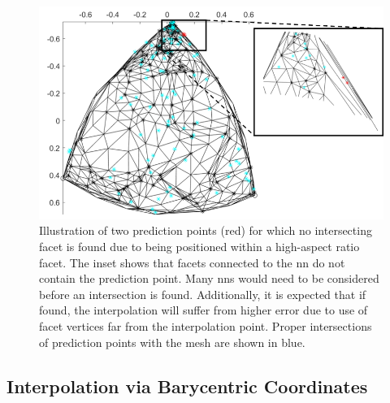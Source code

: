 \documentclass[final,twocolumn,12pt]{elsarticle}
\newcommand{\outpt}{prediction}
\begin{document}
\begin{appendices}
\begin{figure}
    \centering
    \includegraphics[scale=1]{figures/high-aspect-non-int.png}
    \caption{Illustration of two \outpt{} points (red) for which no intersecting facet is found due to being positioned within a high-aspect ratio facet. The inset shows that facets connected to the \gls{nn} do not contain the \outpt{} point. Many \glspl{nn} would need to be considered before an intersection is found. Additionally, it is expected that if found, the interpolation will suffer from higher error due to use of facet vertices far from the interpolation point. Proper intersections of \outpt{} points with the mesh are shown in blue.}
    \label{fig:high-aspect-non-int}
\end{figure}

\subsection{Interpolation via Barycentric Coordinates}
\label{app:bary-interp}


\end{appendices}
\end{document}
